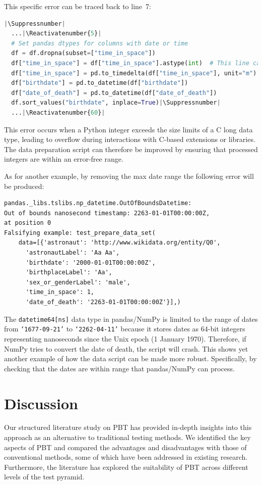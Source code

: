 \documentclass[runningheads]{llncs}
\makeatletter
\let\origthelstnumber\thelstnumber
\newcommand*\Suppressnumber{%
  \lst@AddToHook{OnNewLine}{%
    \let\thelstnumber\relax%
     \advance\c@lstnumber-\@ne\relax%
    }%
}
\newcommand*\Reactivatenumber[1]{%
  \setcounter{lstnumber}{\numexpr#1-1\relax}
  \lst@AddToHook{OnNewLine}{%
   \let\thelstnumber\origthelstnumber%
   \refstepcounter{lstnumber}%
  }%
}
\makeatother
\begin{document}
\noindent This specific error can be traced back to line~7:

\begin{lstlisting}[language=Python,caption={Overflow Error from \texttt{data\_analysis.ipynb}}]
  |\Suppressnumber|
  ...|\Reactivatenumber{5}|
  # Set pandas dtypes for columns with date or time
  df = df.dropna(subset=["time_in_space"])
  df["time_in_space"] = df["time_in_space"].astype(int)  # This line caused the error
  df["time_in_space"] = pd.to_timedelta(df["time_in_space"], unit="m")
  df["birthdate"] = pd.to_datetime(df["birthdate"])
  df["date_of_death"] = pd.to_datetime(df["date_of_death"])
  df.sort_values("birthdate", inplace=True)|\Suppressnumber|
  ...|\Reactivatenumber{60}|

\end{lstlisting}
This error occurs when a Python integer exceeds the size limits of a C long data type, leading to overflow during interactions with C-based extensions or libraries. The data preparation script can therefore be improved by ensuring that processed integers are within an error-free range.

\newpage
\noindent As for another example, by removing the max date range the following error will be produced:

\begin{verbatim}
pandas._libs.tslibs.np_datetime.OutOfBoundsDatetime: 
Out of bounds nanosecond timestamp: 2263-01-01T00:00:00Z, 
at position 0
Falsifying example: test_prepare_data_set(
    data=[{'astronaut': 'http://www.wikidata.org/entity/Q0',
      'astronautLabel': 'Aa Aa',
      'birthdate': '2000-01-01T00:00:00Z',
      'birthplaceLabel': 'Aa',
      'sex_or_genderLabel': 'male',
      'time_in_space': 1,
      'date_of_death': '2263-01-01T00:00:00Z'}],) 
\end{verbatim}

\vspace{5mm}
\noindent The \texttt{datetime64[ns]} data type in pandas/NumPy is limited to the range of dates from \texttt{`1677-09-21'} to \texttt{`2262-04-11'} because it stores dates as 64-bit integers representing nanoseconds since the Unix epoch (1 January 1970). Therefore, if NumPy tries to convert the date of death, the script will crash. This shows yet another example of how the data script can be made more robust. Specifically, by checking that the dates are within range that pandas/NumPy can process.

\section{Discussion}
Our structured literature study on PBT has provided in-depth insights into this approach as an alternative to traditional testing methods. We identified the key aspects of PBT and compared the advantages and disadvantages with those of conventional methods, some of which have been addressed in existing research. Furthermore, the literature has explored the suitability of PBT across different levels of the test pyramid.
\end{document}
